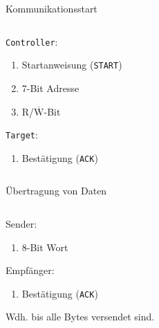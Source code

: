 \documentclass[12pt]{beamer}
\newcounter{listnum}
\begin{document}
	\begin{frame}{Kommunikationsstart}
		\begin{columns}
			\begin{column}{0.45\textwidth}
				\texttt{Controller}:
				\begin{enumerate}
					\item Startanweisung (\texttt{START})
					\item 7-Bit Adresse
					\item R/$\overline{\mbox{W}}$-Bit
					
					\setcounter{listnum}{\value{enumi}}
				\end{enumerate}
				\texttt{Target}:
				\begin{enumerate}
					\setcounter{enumi}{\value{listnum}}
					
					\item Bestätigung (\texttt{ACK})
				\end{enumerate}
			\end{column}
			\begin{column}{0.5\textwidth}
				
			\end{column}
		\end{columns}
	\end{frame}

	\begin{frame}{Übertragung von Daten}
		\begin{columns}
			\begin{column}{0.45\textwidth}
				Sender:
				\begin{enumerate}
					\item 8-Bit Wort
					
					\setcounter{listnum}{\value{enumi}}
				\end{enumerate}
				
				Empfänger:
				\begin{enumerate}
					\setcounter{enumi}{\value{listnum}}
					
					\item Bestätigung (\texttt{ACK})
				\end{enumerate}
				
				\vspace{5ex}
				Wdh. bis alle Bytes versendet sind.
			\end{column}
			\begin{column}{0.5\textwidth}
				
			\end{column}
		\end{columns}
	\end{frame}
\end{document}
